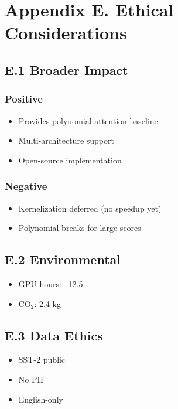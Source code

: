 \section{Appendix E. Ethical Considerations}

\subsection{E.1 Broader Impact}

\subsubsection{Positive}
\begin{itemize}
\item Provides polynomial attention baseline
\item Multi-architecture support
\item Open-source implementation

\end{itemize}
\subsubsection{Negative}
\begin{itemize}
\item Kernelization deferred (no speedup yet)
\item Polynomial breaks for large scores

\end{itemize}
\subsection{E.2 Environmental}

\begin{itemize}
\item GPU-hours: ~12.5
\item CO$_2$: 2.4 kg

\end{itemize}
\subsection{E.3 Data Ethics}

\begin{itemize}
\item SST-2 public
\item No PII
\item English-only

\end{itemize}
